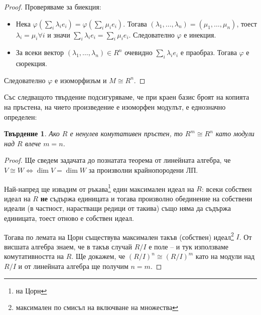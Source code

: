 \documentclass{article}
\newif\ifusemulticols
\theoremstyle{definition}
\theoremstyle{remark}
\theoremstyle{plain}
\theoremstyle{plain}
\newtheorem{prop}[theorem]{Твърдение}
\newenvironment{mymulticols}
    { \ifusemulticols \begin{multicols}{2} \fi }
    { \ifusemulticols \end{multicols} \fi }
\begin{document}
\begin{mymulticols}
\begin{proof}
    Проверяваме за биекция:
    \begin{itemize}
        \item Нека $\varphi(\sum_i \lambda_i e_i) = \varphi(\sum_i \mu_i e_i)$. Тогава
            $\left(\lambda_1, \ldots, \lambda_n\right) = \left(\mu_1,\ldots,\mu_n\right)$, тоест
            $\lambda_i=\mu_i \forall i$ и значи $\sum_i \lambda_i e_i = \sum_i \mu_i e_i$.
            Следователно $\varphi$ е инекция.
        \item За всеки вектор $\left(\lambda_1,\ldots,\lambda_n\right) \in R^n$ очевидно $\sum_i
            \lambda_i e_i$ е праобраз. Тогава $\varphi$ е сюрекция.
    \end{itemize}

    Следователно $\varphi$ е изоморфизъм и $M \cong R^n$.
\end{proof}

Със следващото твърдение подсигуряваме, че при краен базис броят на копията на пръстена, на чието
произведение е изоморфен модулът, е еднозначно определен:
\begin{prop}
    \label{prop:commut_rank}
    Ако $R$ е ненулев комутативен пръстен, то $R^m \cong R^n$ като модули над $R$ влече $m = n$.
\end{prop}
\begin{proof}
    Ще сведем задачата до познатата теорема от линейната алгебра, че $V\cong W \Leftrightarrow \dim
    V=\dim W$ за произволни крайнопородени ЛП.

    Най-напред ще извадим от ръкава\footnote{на Цорн} един максимален идеал на $R$: всеки собствен
    идеал на $R$ \textbf{не} съдържа единицата и тогава произволно обединение на собствени идеали (в
    частност, нарастващи редици от такива) също няма да съдържа единицата, тоест отново е собствен
    идеал.

    Тогава по лемата на Цорн съществува максимален такъв (собствен) идеал\footnote{максимален по
    смисъл на включване на множества} $I$.
    От висшата алгебра знаем, че в такъв случай $R / I$ е поле -- и тук използваме комутативността
    на $R$.
    Ще докажем, че $(R/I)^n \cong (R/I)^m$ като на модули над $R/I$ и от линейната алгебра ще получим $n = m$.


\end{proof}
\end{mymulticols}
\end{document}
